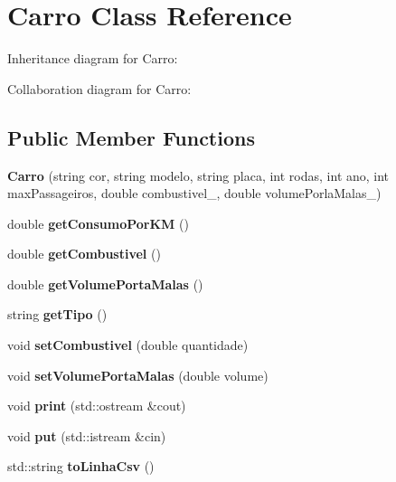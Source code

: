 \hypertarget{classCarro}{}\section{Carro Class Reference}
\label{classCarro}


Inheritance diagram for Carro\+:


Collaboration diagram for Carro\+:
\subsection*{Public Member Functions}
\begin{DoxyCompactItemize}
\item 
\mbox{\label{classCarro_aaf29ee243f81f502edf2fd7d6111d305}} 
{\bfseries Carro} (string cor, string modelo, string placa, int rodas, int ano, int max\+Passageiros, double combustivel\+\_\+, double volume\+Porla\+Malas\+\_\+)
\item 
\mbox{\label{classCarro_ac0fa548c440f6db12b86b4b3d347e5bb}} 
double {\bfseries get\+Consumo\+Por\+KM} ()
\item 
\mbox{\label{classCarro_a941a00304b070388d58a77a1c47ad7c4}} 
double {\bfseries get\+Combustivel} ()
\item 
\mbox{\label{classCarro_a9c1b5709a69b34a406f10301ab98b1c8}} 
double {\bfseries get\+Volume\+Porta\+Malas} ()
\item 
\mbox{\label{classCarro_a98987e2932fe7ee4051b426b74c7d9cc}} 
string {\bfseries get\+Tipo} ()
\item 
\mbox{\label{classCarro_a826a4c03c3bf115d0b71bd5504c32a24}} 
void {\bfseries set\+Combustivel} (double quantidade)
\item 
\mbox{\label{classCarro_ae4624938c5f8f48fc313b3a0a3b6fa48}} 
void {\bfseries set\+Volume\+Porta\+Malas} (double volume)
\item 
\mbox{\label{classCarro_ae358f01446ebc1cf966e233cc26ae5e2}} 
void {\bfseries print} (std\+::ostream \&cout)
\item 
\mbox{\label{classCarro_a78d2b6f206ba9e33b5df2f4722434bc3}} 
void {\bfseries put} (std\+::istream \&cin)
\item 
\mbox{\label{classCarro_ab41a71fde77e7c2c7a1d6f7fa9899970}} 
std\+::string {\bfseries to\+Linha\+Csv} ()
\end{DoxyCompactItemize}
